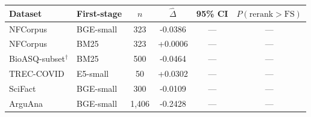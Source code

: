 \begin{tabular}{llSSSc}
\toprule
\textbf{Dataset} & \textbf{First-stage} & \textbf{$n$} & \textbf{$\hat{\Delta}$} & \textbf{95\% CI} & \textbf{$P(\text{rerank}{>}\text{FS})$} \\
\midrule
NFCorpus & BGE-small & 323 & -0.0386 & {---} & {---} \\
NFCorpus & BM25 & 323 & +0.0006 & {---} & {---} \\
BioASQ-subset$^{\dagger}$ & BM25 & 500 & -0.0464 & {---} & {---} \\
TREC-COVID & E5-small & 50 & +0.0302 & {---} & {---} \\
SciFact & BGE-small & 300 & -0.0109 & {---} & {---} \\
ArguAna & BGE-small & 1,406 & -0.2428 & {---} & {---} \\
\bottomrule
\end{tabular}

